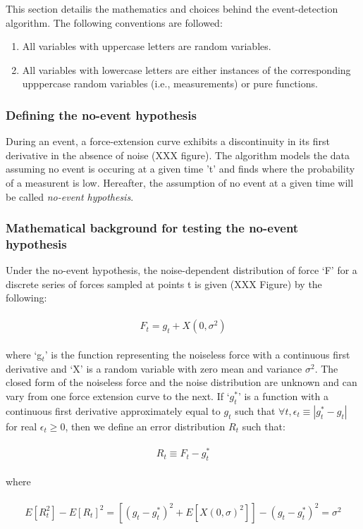 \documentclass[%
  aip,12pt,tightenlines,
  amsthm,
 amsmath,amssymb
]{article}
\newcommand{\eqs}[1]{
\begin{align*} 
\begin{split}
#1
\end{split}					
\end{align*}}
\newcommand{\firstp}[0]{}
\newcommand{\pl}[0]{\vspace{6pt}}
\begin{document}
This section detailis the mathematics and choices behind the event-detection algorithm. The following conventions are followed:

\begin{enumerate}
 \item All variables with uppercase letters are random variables.
 \item All variables with lowercase letters are either instances of the corresponding upppercase random variables (i.e., measurements) or pure functions. 
\end{enumerate}

\subsubsection{Defining the no-event hypothesis}

\firstp During an event, a force-extension curve exhibits a discontinuity in its first derivative in the absence of noise (XXX figure). The algorithm models the data assuming no event is occuring at a given time 't' and finds where the probability of a measurent is low. Hereafter, the assumption of no event at a given time will be called \emph{no-event hypothesis}. 

\subsubsection{Mathematical background for testing the no-event hypothesis}

\firstp Under the no-event hypothesis, the noise-dependent distribution of force `F' for a discrete series of forces sampled at points t is given (XXX Figure) by the following:

\eqs{ F_t = g_t + X(0,\sigma^2) }

where `g$_t$' is the function representing the noiseless force with a continuous first derivative and `X' is a random variable with zero mean and variance $\sigma^2$. The closed form of the noiseless force and the noise distribution are unknown and can vary from one force extension curve to the next. If `$g^{*}_t$' is a function with a continuous first derivative approximately equal to $g_t$ such that $\forall t,\epsilon_t\equiv|g^{*}_t-g_t|$ for real $\epsilon_t\ge 0$, then we define an error distribution $R_t$ such that: \pl

\eqs{ R_t \equiv F_t - g^{*}_t }

where

\eqs{ E[R_t^2] -E[R_t]^2 = [(g_t-g^{*}_t)^2 + E[X(0,\sigma)^2]] - (g_t-g^{*}_t)^2  = \sigma^2 }
\end{document}
